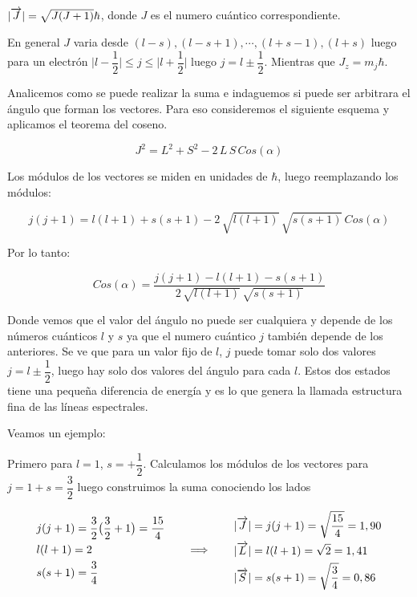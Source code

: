 $\vert \overrightarrow{J} \vert = \sqrt{J(J+1)}\hbar$, donde $J$ es el numero cuántico correspondiente.

En general $J$ varia desde $(l-s), (l-s+1), \cdots, (l+s-1), (l+s)$ luego para un electrón $\vert l-\dfrac{1}{2}\vert \leq j \leq \vert l+\dfrac{1}{2}\vert$ luego $j=l \pm \dfrac{1}{2}$. Mientras que $J_{z}=m_{j}\hbar$.
 
Analicemos como se puede realizar la suma e indaguemos si puede ser arbitrara el ángulo que forman los vectores. Para eso consideremos el siguiente esquema y aplicamos el teorema del coseno.

\begin{equation}
	J^{2}=L^{2}+S^{2}-2\,L\,S\,Cos(\alpha)
\end{equation}

Los módulos de los vectores se miden en unidades de $\hbar$, luego reemplazando los módulos:

\begin{equation}
	j(j+1)=l(l+1)+s(s+1)-2\,\sqrt{l(l+1)}\,\sqrt{s(s+1)}\,Cos(\alpha)
\end{equation}

Por lo tanto:

\begin{equation}
	Cos(\alpha) = \dfrac{j(j+1)-l(l+1)-s(s+1)}{2\,\sqrt{l(l+1)}\,\sqrt{s(s+1)}}
\end{equation}

Donde vemos que el valor del ángulo no puede ser cualquiera y depende de los números cuánticos $l$ y $s$ ya que el numero cuántico $j$ también depende de los anteriores. Se ve que para un valor fijo de $l$,  $j$ puede tomar solo dos valores $j=l \pm \dfrac{1}{2}$, luego hay solo dos valores del ángulo para cada $l$. Estos dos estados tiene una pequeña diferencia de energía y es lo que genera la llamada estructura fina de las líneas espectrales.

Veamos un ejemplo: 

Primero para $l=1$, $s=+\dfrac{1}{2}$. Calculamos los módulos de los vectores para $j=1+s=\dfrac{3}{2}$ luego construimos la suma conociendo los lados

\begin{equation*}
	\begin{aligned}[c]
		&j(j + 1)=\dfrac{3}{2}\big(\dfrac{3}{2}+1\big)= \dfrac{15}{4}\\
		&l(l + 1)=2\\
		&s(s + 1)=\dfrac{3}{4}
	\end{aligned}
\qquad\Longrightarrow\qquad
	\begin{aligned}[c]
		&\vert \overrightarrow{J} \vert = j(j + 1) = \sqrt{\dfrac{15}{4}} = 1,90\\
		&\vert \overrightarrow{L} \vert = l(l + 1) = \sqrt{2} = 1,41\\
		&\vert \overrightarrow{S} \vert = s(s + 1) = \sqrt{\dfrac{3}{4}} = 0,86
	\end{aligned}
\end{equation*}

